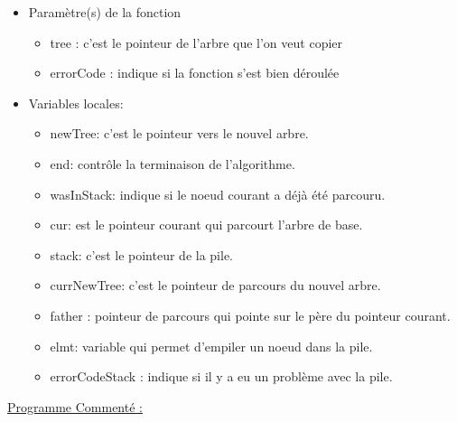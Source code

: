 \documentclass[a4paper]{article}
\begin{document}
\begin{itemize}
\item Paramètre(s) de la fonction  
\begin{itemize}
\item tree : c'est le pointeur de l'arbre que l'on veut copier
\item errorCode : indique si la fonction s'est bien déroulée 
\end{itemize}
\item Variables locales:
\begin{itemize}
\item newTree: c'est le pointeur vers le nouvel arbre.
\item end: contrôle la terminaison de l'algorithme.
\item wasInStack: indique si le noeud courant a déjà été parcouru.
\item cur: est le pointeur courant qui parcourt l'arbre de base.
\item stack: c'est le pointeur de la pile.
\item currNewTree: c'est le pointeur de parcours du nouvel arbre.
\item father : pointeur de parcours qui pointe sur le père du pointeur courant.
\item elmt: variable qui permet d'empiler un noeud dans la pile.
\item errorCodeStack : indique si il y a eu un problème avec la pile.
\end{itemize}
\end{itemize}
\underline{Programme Commenté :}


\end{document}
